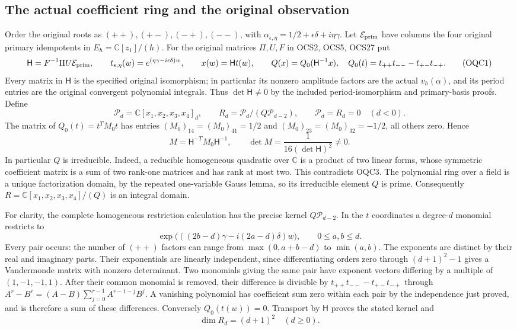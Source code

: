 \documentclass[11pt,a4paper]{article}
\begin{document}
\subsection{The actual coefficient ring and the original observation}
Order the original roots as $(++),(+-),(-+),(--)$, with
$\alpha_{\epsilon,\eta}=1/2+\epsilon\delta+i\eta\gamma$.
Let $\mathcal E_{\rm prim}$ have columns the four original primary
idempotents in $E_h=\mathbb C[z_1]/(h)$. For the original matrices
$\Pi,U,F$ in OCS2, OCS5, OCS27 put
\[
 \mathsf H=F^{-1}\Pi U\mathcal E_{\rm prim},\qquad
 t_{\epsilon,\eta}(w)=e^{(\eta\gamma-i\epsilon\delta)w},\qquad
 x(w)=\mathsf Ht(w),\qquad
 Q(x)=Q_0(\mathsf H^{-1}x),\quad
 Q_0(t)=t_{++}t_{--}-t_{+-}t_{-+}.
 \tag{OQC1}
\]
Every matrix in $\mathsf H$ is the specified original isomorphism;
in particular its nonzero amplitude factors are the actual
$v_h(\alpha)$, and its period entries are the original convergent
polynomial integrals. Thus $\det\mathsf H\ne0$ by the included
period-isomorphism and primary-basis proofs. Define
\[
 \mathscr P_d=\mathbb C[x_1,x_2,x_3,x_4]_d,\qquad
 R_d=\mathscr P_d/(Q\mathscr P_{d-2}),\qquad
 \mathscr P_d=R_d=0\quad(d<0).
 \tag{OQC2}
\]
The matrix of $Q_0(t)=t^TM_0t$ has entries
$(M_0)_{14}=(M_0)_{41}=1/2$ and
$(M_0)_{23}=(M_0)_{32}=-1/2$, all others zero. Hence
\[
 M=\mathsf H^{-T}M_0\mathsf H^{-1},\qquad
 \det M=\frac{1}{16(\det\mathsf H)^2}\ne0.
 \tag{OQC3}
\]
In particular $Q$ is irreducible. Indeed, a reducible homogeneous
quadratic over $\mathbb C$ is a product of two linear forms, whose
symmetric coefficient matrix is a sum of two rank-one matrices and
has rank at most two. This contradicts OQC3. The polynomial ring
over a field is a unique factorization domain, by the repeated
one-variable Gauss lemma, so its irreducible element $Q$ is prime.
Consequently $R=\mathbb C[x_1,x_2,x_3,x_4]/(Q)$ is an integral domain.

For clarity, the complete homogeneous restriction calculation has
the precise kernel $Q\mathscr P_{d-2}$. In the $t$ coordinates a
degree-$d$ monomial restricts to
\[
 \exp\bigl(((2b-d)\gamma-i(2a-d)\delta)w\bigr),
       \qquad 0\leq a,b\leq d.
 \tag{OQC4}
\]
Every pair occurs: the number of $(++)$ factors can range from
$\max(0,a+b-d)$ to $\min(a,b)$. The exponents are distinct by
their real and imaginary parts. Their exponentials are linearly
independent, since differentiating orders zero through $(d+1)^2-1$
gives a Vandermonde matrix with nonzero determinant. Two monomials
giving the same pair have exponent vectors differing by a multiple
of $(1,-1,-1,1)$. After their common monomial is removed, their
difference is divisible by $t_{++}t_{--}-t_{+-}t_{-+}$ through
$A^r-B^r=(A-B)\sum_{j=0}^{r-1}A^{r-1-j}B^j$. A vanishing
polynomial has coefficient sum zero within each pair by the
independence just proved, and is therefore a sum of these differences.
Conversely $Q_0(t(w))=0$. Transport by $\mathsf H$ proves the
stated kernel and
\[
                  \dim R_d=(d+1)^2\quad(d\geq0).
 \tag{OQC5}
\]
\end{document}
